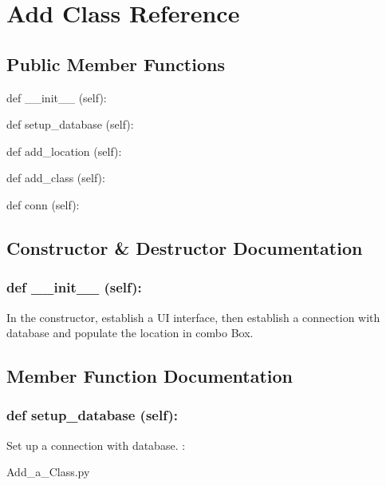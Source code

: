 \hypertarget{Add_Class}{\section{Add Class Reference}
\label{Add_Class}
}
\subsection*{Public Member Functions}
\begin{DoxyCompactItemize}
\item 
def {\_\_init\_\_} (self):
\item 
def {setup\_database} (self):
\item 
def {add\_location} (self):
\item 
def {add\_class} (self):
\item 
def {conn} (self):
\end{DoxyCompactItemize}

\subsection{Constructor \& Destructor Documentation}
\hypertarget{class_poly_aa3def076b74bed67904976ad4f9fe9b1}{
\subsubsection[{def __init__ (self):}]{\setlength{\rightskip}{0pt plus 5cm}def {\_\_init\_\_} (self): 
}}
In the constructor, establish a UI interface, then establish a connection with database and populate the location in combo Box.
 

\subsection{Member Function Documentation}
\hypertarget{class_poly_a14a7ad77ce612b0c54f531d307ee4b39}{
\subsubsection[{def setup_database (self):}]{\setlength{\rightskip}{0pt plus 5cm}def {setup\_database} (self):}}\label{class_poly_a14a7ad77ce612b0c54f531d307ee4b39}
Set up a connection with database.
:\begin{DoxyCompactItemize}
\item 
Add\_a\_Class.\-py\end{DoxyCompactItemize}

